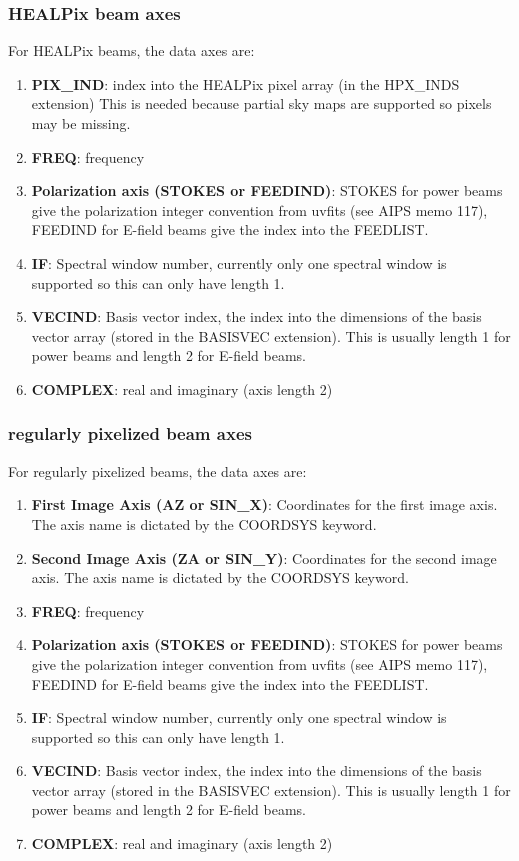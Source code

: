 \documentclass[11pt, oneside]{article}   	%
\begin{document}
\subsubsection{HEALPix beam axes}
For HEALPix beams, the data axes are: 
\begin{enumerate}
\item{\textbf{PIX\_IND}: index into the HEALPix pixel array (in the HPX\_INDS extension) This is needed because partial sky maps are supported so pixels may be missing.}
\item{\textbf{FREQ}: frequency}
\item{\textbf{Polarization axis (STOKES or FEEDIND)}: STOKES for power beams give the polarization integer convention from uvfits (see AIPS memo 117), FEEDIND for E-field beams give the index into the FEEDLIST.}
\item{\textbf{IF}: Spectral window number, currently only one spectral window is supported so this can only have length 1.}
\item{\textbf{VECIND}: Basis vector index, the index into the dimensions of the basis vector array (stored in the BASISVEC extension). This is usually length 1 for power beams and length 2 for E-field beams.}
\item{\textbf{COMPLEX}: real and imaginary (axis length 2)}
\end{enumerate}

\subsubsection{regularly pixelized beam axes}
For regularly pixelized beams, the data axes are: 
\begin{enumerate}
\item{\textbf{First Image Axis (AZ or SIN\_X)}: Coordinates for the first image axis. The axis name is dictated by the COORDSYS keyword.}
\item{\textbf{Second Image Axis (ZA or SIN\_Y)}: Coordinates for the second image axis. The axis name is dictated by the COORDSYS keyword.}
\item{\textbf{FREQ}: frequency}
\item{\textbf{Polarization axis (STOKES or FEEDIND)}: STOKES for power beams give the polarization integer convention from uvfits (see AIPS memo 117), FEEDIND for E-field beams give the index into the FEEDLIST.}
\item{\textbf{IF}: Spectral window number, currently only one spectral window is supported so this can only have length 1.}
\item{\textbf{VECIND}: Basis vector index, the index into the dimensions of the basis vector array (stored in the BASISVEC extension). This is usually length 1 for power beams and length 2 for E-field beams.}
\item{\textbf{COMPLEX}: real and imaginary (axis length 2)}
\end{enumerate}
\end{document}
